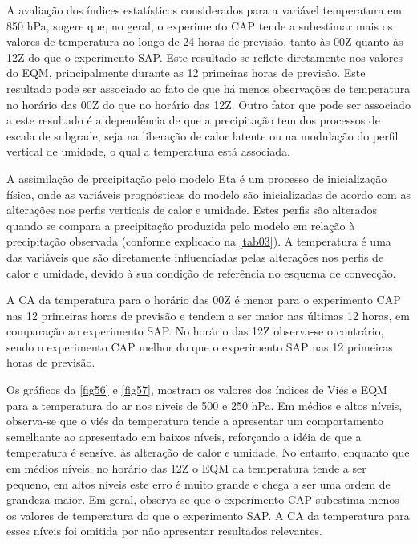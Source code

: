 A avaliação dos índices estatísticos considerados para a variável temperatura em 850 hPa, sugere que, no geral, o experimento CAP tende a subestimar mais os valores de temperatura ao longo de 24 horas de previsão, tanto às 00Z quanto às 12Z do que o experimento SAP. Este resultado se reflete diretamente nos valores do EQM, principalmente durante as 12 primeiras horas de previsão. Este resultado pode ser associado ao fato de que há menos observações de temperatura no horário das 00Z do que no horário das 12Z. Outro fator que pode ser associado a este resultado é a dependência de que a precipitação tem dos processos de escala de subgrade, seja na liberação de calor latente ou na modulação do perfil vertical de umidade, o qual a temperatura está associada.

A assimilação de precipitação pelo modelo Eta é um processo de inicialização física, onde as variáveis prognósticas do modelo são inicializadas de acordo com as alterações nos perfis verticais de calor e umidade. Estes perfis são alterados quando se compara a precipitação produzida pelo modelo em relação à precipitação observada (conforme explicado na \autoref{tab03}). A temperatura é uma das variáveis que são diretamente influenciadas pelas alterações nos perfis de calor e umidade, devido à sua condição de referência no esquema de convecção. 

A CA da temperatura para o horário das 00Z é menor para o experimento CAP nas 12 primeiras horas de previsão e tendem a ser maior nas últimas 12 horas, em comparação ao experimento SAP. No horário das 12Z observa-se o contrário, sendo o experimento CAP melhor do que o experimento SAP nas 12 primeiras horas de previsão.

Os gráficos da \autoref{fig56} e \autoref{fig57}, mostram os valores dos índices de Viés e EQM para a temperatura do ar nos níveis de 500 e 250 hPa. Em médios e altos níveis, observa-se que o viés da temperatura tende a apresentar um comportamento semelhante ao apresentado em baixos níveis, reforçando a idéia de que a temperatura é sensível às alteração de calor e umidade. No entanto, enquanto que em médios níveis, no horário das 12Z o EQM da temperatura tende a ser pequeno, em altos níveis este erro é muito grande e chega a ser uma ordem de grandeza maior. Em geral, observa-se que o experimento CAP subestima menos os valores de temperatura do que o experimento SAP. A CA da temperatura para esses níveis foi omitida por não apresentar resultados relevantes.
     
